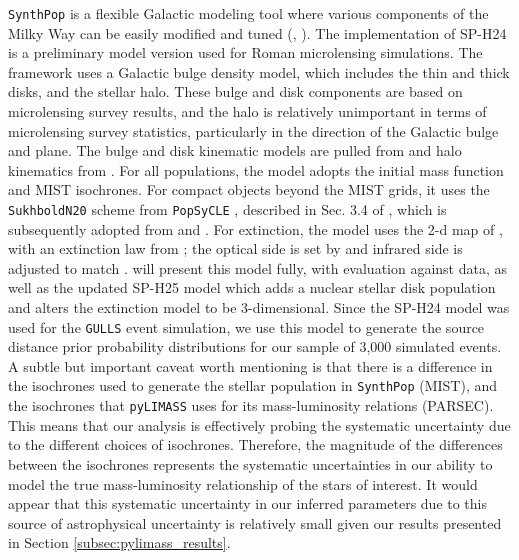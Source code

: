 \documentclass[twocolumn]{aastex631}
\begin{document}
\indent \texttt{SynthPop} is a flexible Galactic modeling tool where various components of the Milky Way can be easily modified and tuned (, \citeyear{kluter:2025a}). The implementation of SP-H24 is a preliminary model version used for Roman microlensing simulations. The framework uses a Galactic bulge density model, which includes the thin and thick disks, and the stellar halo. These bulge and disk components are based on microlensing survey results, and the halo is relatively unimportant in terms of microlensing survey statistics, particularly in the direction of the Galactic bulge and plane. The bulge and disk kinematic models are pulled from \cite{koshimoto:2021a} and halo kinematics from \cite{Robin2003}. For all populations, the model adopts the \citet{Kroupa2001} initial mass function and MIST \citep[MESA Isochrones and Stellar Tracks]{Choi2016,Dotter2016} isochrones. For compact objects beyond the MIST grids, it uses the \texttt{SukhboldN20} scheme from \texttt{PopSyCLE} \citep{lam:2020a}, described in Sec. 3.4 of \citealp{Rose2022}, which is subsequently adopted from \cite{Sukhbold2014,Sukhbold2016, Woosley2017, Woosley2020} and \cite{Kalirai2008}. For extinction, the model uses the 2-d map of \citet{Surot2020}, with an extinction law from \citet{Cardelli1989}; the optical side is set by \citet{O'Donnell1994} and infrared side is adjusted to match \citet{Surot2020}. \cite{huston:inprep} will present this model fully, with evaluation against data, as well as the updated SP-H25 model which adds a nuclear stellar disk population and alters the extinction model to be 3-dimensional. Since the SP-H24 model was used for the \texttt{GULLS} event simulation, we use this model to generate the source distance prior probability distributions for our sample of 3,000 simulated events. \\
\indent A subtle but important caveat worth mentioning is that there is a difference in the isochrones used to generate the stellar population in \texttt{SynthPop} (MIST), and the isochrones that \texttt{pyLIMASS} uses for its mass-luminosity relations (PARSEC). This means that our analysis is effectively probing the systematic uncertainty due to the different choices of isochrones. Therefore, the magnitude of the differences between the isochrones represents the systematic uncertainties in our ability to model the true mass-luminosity relationship of the stars of interest. It would appear that this systematic uncertainty in our inferred parameters due to this source of astrophysical uncertainty is relatively small given our results presented in Section \ref{subsec:pylimass_results}.\\
\end{document}
